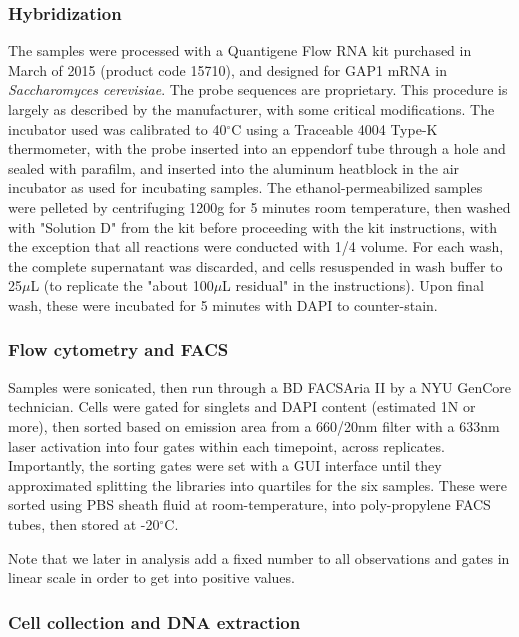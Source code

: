 \subsubsection{Hybridization}

The samples were processed with a Quantigene Flow RNA kit purchased in
March of 2015 (product code 15710), and designed for GAP1 mRNA in
\emph{Saccharomyces cerevisiae}. The probe sequences are proprietary.
This procedure is largely as described by the manufacturer, with some
critical modifications.
The incubator used was calibrated to 40\(^{\circ}\)C using a Traceable
4004 Type-K thermometer, with the probe inserted into an eppendorf tube
through a hole and sealed with parafilm, and inserted into the aluminum
heatblock in the air incubator as used for incubating samples. 
The ethanol-permeabilized samples were pelleted by centrifuging 
1200g for 5 minutes room temperature, then washed with "Solution D"
from the kit before proceeding with the kit instructions, with the
exception that all reactions were conducted with 1/4 volume. 
For each wash, the complete supernatant was discarded, and cells
resuspended in wash buffer to 25$\mu$L (to replicate the "about
100$\mu$L residual" in the instructions).
Upon final wash, these were incubated for 5 minutes with DAPI
to counter-stain.

\subsubsection{Flow cytometry and FACS}

Samples were sonicated, then run through a BD FACSAria II
by a NYU GenCore technician.
Cells were gated for singlets and DAPI content 
(estimated 1N or more), then sorted based on emission area from a
660/20nm filter with a 633nm laser activation
into four gates within each timepoint, across replicates.
Importantly, the sorting gates were set with a GUI interface until they
approximated splitting the libraries into quartiles for the six samples.
These were sorted using PBS sheath fluid at room-temperature, into
poly-propylene FACS tubes, then stored at -20$^{\circ}$C.

Note that we later in analysis add a fixed number to all observations
and gates in linear scale in order to get into positive values.

\subsubsection{Cell collection and DNA extraction}


